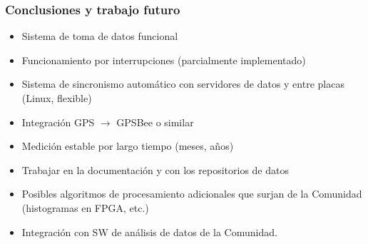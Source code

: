 \documentclass{beamer}
\begin{document}
\begin{frame}
				\frametitle{Conclusiones y trabajo futuro}
				\begin{exampleblock}{}
								\begin{itemize}
												\item Sistema de toma de datos funcional 
												\item Funcionamiento por interrupciones (parcialmente	implementado)
												\item Sistema de sincronismo automático con servidores de datos y entre
																placas (Linux, flexible)
												\item Integración GPS $\to$ GPSBee o similar 
												\item Medición estable por largo tiempo (meses, años)
												\item Trabajar en la documentación y con los repositorios de datos
												\item Posibles algoritmos de procesamiento adicionales que surjan de la
																Comunidad (histogramas en FPGA, etc.)
												\item Integración con SW de análisis de datos de la
																Comunidad.
								\end{itemize}
				\end{exampleblock}
\end{frame}
\end{document}
